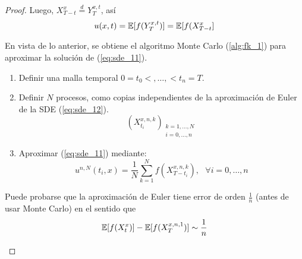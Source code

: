 \begin{proof}
 Luego, $X_{T-t}^{x} \stackrel{d}{=} Y_{T}^{x,t}$,  así
 \begin{equation*}
         u(x,t) = \mathbb{E} [f(Y_{T}^{x,t})] = \mathbb{E} [f(X_{T-t}^{x}]
 \end{equation*}

 En vista de lo anterior, se obtiene el algoritmo Monte Carlo (\ref{alg:fk_1}) para aproximar la 
 solución de (\ref{eq:sde_11}). 

 \begin{algorithm}
 \label{alg:fk_1}
 \begin{leftbar}
 \begin{enumerate}
         \item   Definir una malla temporal $0 = t_0 <,\ldots, < t_n = T$. 
         \item Definir $N$ procesos, como copias independientes de la aproximación de Euler de 
             la SDE (\ref{eq:sde_12}). 
             \begin{equation*}
                 \left( X_{t_i}^{x,n,k} \right)_{
                         \substack{ k = 1,\ldots, N \\  i = 0 , \ldots, n}}
             \end{equation*}
     \item Aproximar (\ref{eq:sde_11}) mediante: 
            \begin{equation*}
                u^{n,N}(t_i,x) = \frac{1}{N} \sum_{k=1}^{N} f\left( X_{T-t_i}^{x,n,k} \right), 
                ~ ~ ~ \forall i = 0, \ldots, n
            \end{equation*}
 \end{enumerate}
 \end{leftbar}
 \end{algorithm}
 \begin{remark}
         Puede probarse que la aproximación de Euler tiene error de orden $\frac{1}{n}$ 
         (antes de usar Monte Carlo) en el sentido que 
         \begin{equation*}
                 \mathbb{E} [f(X_t^{x})] - \mathbb{E}[f ( X_T^{x,n,1})] \sim \frac{1}{n}
         \end{equation*}
 \end{remark} \findem
\negro
\end{proof}




% 